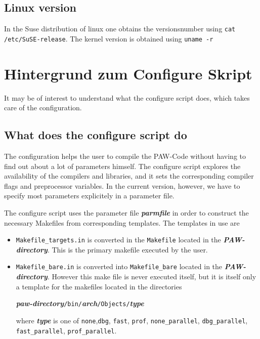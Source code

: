 \documentclass[a4paper,10pt]{report}
\newcommand{\myspec}[1]{\textbf{\textit{#1}}}
\newcommand{\mytt}[1]{{\tt #1}}
\begin{document}
\subsection{Linux version}

In the Suse distribution of linux one obtains the versionsnumber using
\verb+cat /etc/SuSE-release+.  The kernel version is obtained using
\verb+uname -r+

\section{Hintergrund zum Configure Skript}
\label{sec:configurebackground}
It may be of interest to understand what the configure script does,
which takes care of the configuration.

\subsection{What does the configure script do}
The configuration helps the user to compile the PAW-Code without
having to find out about a lot of parameters himself.  The configure
script explores the availability of the compilers and libraries, and
it sets the corresponding compiler flags and preprocessor
variables. In the current version, however, we have to specify most
parameters explicitely in a parameter file.

The configure script uses the parameter file \myspec{parmfile} in
order to construct the necessary Makefiles from corresponding
templates. The templates in use are
\begin{itemize}
\item \mytt{Makefile\_targets.in} is converted in the \mytt{Makefile}
located in the \myspec{PAW-directory}. This is the primary makefile
executed by the user.
\item \mytt{Makefile\_bare.in} is converted into \mytt{Makefile\_bare}
located in the \myspec{PAW-directory}. However this make file is never
executed itself, but it is itself only a template for the makefiles located in the directories
\begin{center}
\myspec{paw-directory}\mytt{/bin/}\myspec{arch}\mytt{/Objects/}\myspec{type}
\end{center}
where \myspec{type} is one of \mytt{none},\mytt{dbg}, \mytt{fast},
\mytt{prof}, \mytt{none\_parallel}, \mytt{dbg\_parallel},
\mytt{fast\_parallel}, \mytt{prof\_parallel}.
\end{itemize}
\end{document}
